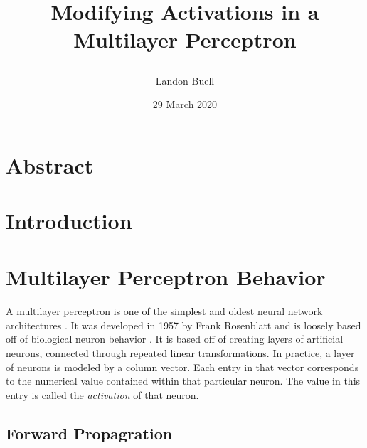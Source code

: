 \documentclass[12pt,letterpaper]{article}
\begin{document}

\title{\begin{Huge}
Modifying Activations in a Multilayer Perceptron
\end{Huge}}
\author{Landon Buell}
\date{29 March 2020}
\maketitle


\section{Abstract}



\section{Introduction}



\section{Multilayer Perceptron Behavior}

\paragraph*{}A multilayer perceptron is one of the simplest and oldest neural network architectures \cite{Geron}. It was developed in 1957 by Frank Rosenblatt and is loosely based off of biological neuron behavior \cite{McCulloch}. It is based off of creating layers of artificial neurons, connected through repeated linear transformations. In practice, a layer of neurons is modeled by a column vector. Each entry in that vector corresponds to the numerical value contained within that particular neuron. The value in this entry is called the \textit{activation} of that neuron.

\subsection{Forward Propagration}
\end{document}
